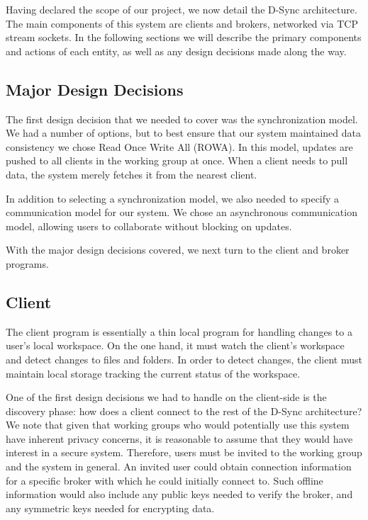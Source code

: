 Having declared the scope of our project,
we now detail the D-Sync architecture.
The main components of this system are clients and brokers,
networked via TCP stream sockets.
In the following sections we will describe the primary
components and actions of each entity,
as well as any design decisions made along the way.

\subsection{Major Design Decisions}
The first design decision that we needed to cover was the synchronization
model.
We had a number of options, but to best ensure
that our system maintained data consistency
we chose Read Once Write All (ROWA). In this model,
updates are pushed to all clients in the working group
at once.
When a client needs to pull data,
the system merely fetches it from the nearest client.

In addition to selecting a synchronization model,
we also needed to specify a communication model for our system.
We chose an asynchronous communication model,
allowing users to collaborate without blocking on updates.


With the major design decisions covered, we next turn to 
the client and broker programs.

\subsection{Client}
The client program is essentially a thin local program
for handling changes to a user's local workspace.
On the one hand, it must watch the client's workspace
and detect changes to files and folders.
In order to detect changes,
the client must maintain local storage tracking
the current status of the workspace.

One of the first design decisions we had to handle on the client-side
is the discovery phase: how does a client connect to the rest of the 
D-Sync architecture?
We note that given that working groups who would potentially
use this system have inherent privacy concerns,
it is reasonable to assume that they would have interest in a secure system.
Therefore, users must be invited to the working group and the system in general.
An invited user could obtain connection information for a specific broker
with which he could initially connect to.
Such offline information would also include any public keys needed
to verify the broker, and any symmetric keys needed for encrypting data.

